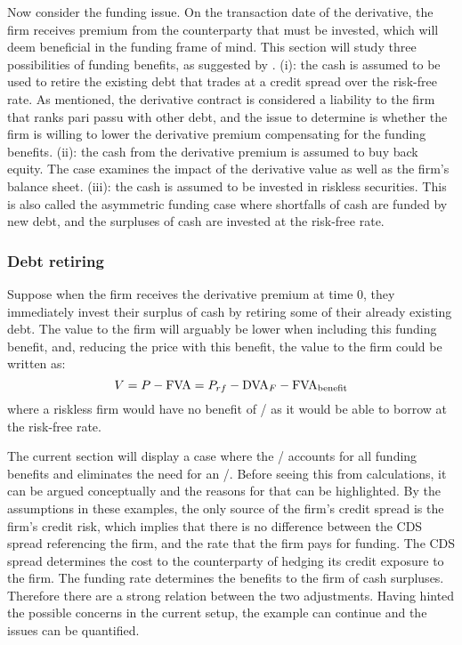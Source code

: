 \documentclass[../main.tex]{subfiles}
\begin{document}
        Now consider the funding issue. On the transaction date of the derivative, 
        the firm receives premium from the counterparty that must be invested, 
        which will deem beneficial in the funding frame of mind. 
        This section will study three possibilities of funding benefits, 
        as suggested by \textcite{Hillion2016}.
        (i): the cash is assumed to be used to retire the existing debt 
        that trades at a credit spread over the risk-free rate. 
        As mentioned, the derivative contract is considered a liability to the firm
        that ranks pari passu with other debt, 
        and the issue to determine is whether the firm is willing to lower the derivative premium 
        compensating for the funding benefits. 
        (ii): the cash from the derivative premium is assumed to buy back equity. 
        The case examines the impact of the derivative value as well as the firm's balance sheet. 
        (iii): the cash is assumed to be invested in riskless securities. 
        This is also called the asymmetric funding case where shortfalls of cash are funded by new debt, 
        and the surpluses of cash are invested at the risk-free rate.

        \subsubsection{Debt retiring}
            Suppose when the firm receives the derivative premium at time 0, 
            they immediately invest their surplus of cash by retiring some of their already existing debt. 
            The value to the firm will arguably be lower when including this funding benefit, 
            and, reducing the price with this benefit, the value to the firm could be written as:
            \begin{equation}
                V = P - \FVA/ = P_{rf} - \DVA/_F - \FBA/
            \end{equation}
            where a riskless firm would have no benefit of \FVA/ as it would be able to borrow at the risk-free rate.
            
            The current section will display a case where the \DVA/
            accounts for all funding benefits and eliminates the need for an \FVA/.
            Before seeing this from calculations, it can be argued conceptually
            and the reasons for that can be highlighted.
            By the assumptions in these examples,
            the only source of the firm's credit spread is the firm's credit risk, 
            which implies that there is no difference between the CDS spread referencing the firm,
            and the rate that the firm pays for funding.
            The CDS spread determines the cost to the counterparty 
            of hedging its credit exposure to the firm.
            The funding rate determines the benefits to the firm of cash surpluses.
            Therefore there are a strong relation between the two adjustments.
            Having hinted the possible concerns in the current setup, 
            the example can continue and the issues can be quantified.
\end{document}

